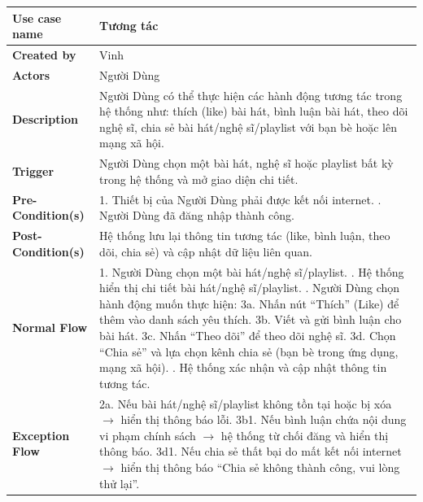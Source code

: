 \documentclass[a4paper]{article}
\newcommand{\cach}{\hspace*{1.5em}\ignorespaces}
\begin{document}
\begin{table}[h!]
\centering
\renewcommand{\arraystretch}{1.3} %
\begin{tabularx}{\textwidth}{|l|X|}
\hline
\textbf{Use case name} & Tương tác \\ \hline
\textbf{Created by}    & Vinh \\ \hline
\textbf{Actors}        & Người Dùng \\ \hline
\textbf{Description}   & Người Dùng có thể thực hiện các hành động tương tác trong hệ thống như: thích (like) bài hát, bình luận bài hát, theo dõi nghệ sĩ, chia sẻ bài hát/nghệ sĩ/playlist với bạn bè hoặc lên mạng xã hội. \\ \hline
\textbf{Trigger}       & Người Dùng chọn một bài hát, nghệ sĩ hoặc playlist bất kỳ trong hệ thống và mở giao diện chi tiết. \\ \hline
\textbf{Pre-Condition(s)} 
& 1. Thiết bị của Người Dùng phải được kết nối internet. \newline
  2. Người Dùng đã đăng nhập thành công. \\ \hline
\textbf{Post-Condition(s)} 
& Hệ thống lưu lại thông tin tương tác (like, bình luận, theo dõi, chia sẻ) và cập nhật dữ liệu liên quan. \\ \hline
\textbf{Normal Flow}   
& 1. Người Dùng chọn một bài hát/nghệ sĩ/playlist. \newline
  2. Hệ thống hiển thị chi tiết bài hát/nghệ sĩ/playlist. \newline
  3. Người Dùng chọn hành động muốn thực hiện: \newline
  \cach 3a. Nhấn nút “Thích” (Like) để thêm vào danh sách yêu thích. \newline
  \cach 3b. Viết và gửi bình luận cho bài hát. \newline
  \cach 3c. Nhấn “Theo dõi” để theo dõi nghệ sĩ. \newline
  \cach 3d. Chọn “Chia sẻ” và lựa chọn kênh chia sẻ (bạn bè trong ứng \cach dụng, mạng xã hội). \newline
  4. Hệ thống xác nhận và cập nhật thông tin tương tác. \\ \hline
\textbf{Exception Flow} 
& 2a. Nếu bài hát/nghệ sĩ/playlist không tồn tại hoặc bị xóa $\rightarrow$ hiển thị thông báo lỗi. \newline
  3b1. Nếu bình luận chứa nội dung vi phạm chính sách $\rightarrow$ hệ thống từ chối đăng và hiển thị thông báo. \newline
  3d1. Nếu chia sẻ thất bại do mất kết nối internet $\rightarrow$ hiển thị thông báo “Chia sẻ không thành công, vui lòng thử lại”. \\ \hline

\end{tabularx}
\end{table}
\end{document}

